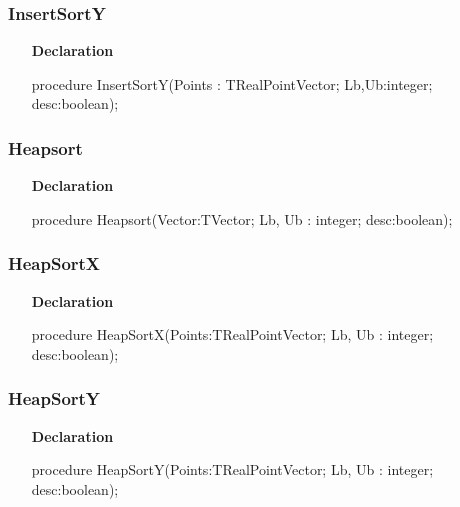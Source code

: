 \documentclass[12pt,a4paper,oneside]{report}
\newcommand{\declarationitem}[1]{\textbf{#1}}
\begin{document}
\subsubsection{InsertSortY}
\label{lmsorting-InsertSortY}
\begin{itemize}\item[\declarationitem{Declaration}\hfill]
	\begin{flushleft}
		\begin{ttfamily}
			procedure InsertSortY(Points : TRealPointVector; Lb,Ub:integer; desc:boolean);\end{ttfamily}
		
	\end{flushleft}
	
\end{itemize}
\subsubsection{Heapsort}
\label{lmsorting-Heapsort}
\begin{itemize}\item[\declarationitem{Declaration}\hfill]
	\begin{flushleft}
		\begin{ttfamily}
			procedure Heapsort(Vector:TVector; Lb, Ub : integer; desc:boolean);\end{ttfamily}
		
	\end{flushleft}
	
\end{itemize}
\subsubsection{HeapSortX}
\label{lmsorting-HeapSortX}
\begin{itemize}\item[\declarationitem{Declaration}\hfill]
	\begin{flushleft}
		\begin{ttfamily}
			procedure HeapSortX(Points:TRealPointVector; Lb, Ub : integer; desc:boolean);\end{ttfamily}
		
	\end{flushleft}
	
\end{itemize}
\subsubsection{HeapSortY}
\label{lmsorting-HeapSortY}
\begin{itemize}\item[\declarationitem{Declaration}\hfill]
	\begin{flushleft}
		\begin{ttfamily}
			procedure HeapSortY(Points:TRealPointVector; Lb, Ub : integer; desc:boolean);\end{ttfamily}
		
	\end{flushleft}
\end{itemize}
\end{document}
